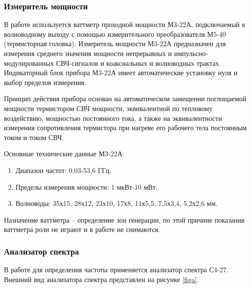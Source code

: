 \documentclass[a4paper,14pt]{extarticle}
\begin{document}
	\subsubsection{Измеритель мощности}
	В работе используется ваттметр проходной мощности М3-22А, подключаемый к волноводному выходу с помощью измерительного преобразователя М5-40 (термисторная головка). Измеритель мощности М3-22А предназначен для измерения среднего значения мощности непрерывных и импульсно-модулированных СВЧ-сигналов и коаксиальных и волноводных трактах. Индикаторный блок прибора М3-22А имеет автоматические установку нуля и выбор пределов измерения.
	
	Принцип действия прибора основан на автоматическом замещении поглощаемой мощности термистором СВЧ мощности, эквивалентной по тепловому воздействию, мощностью постоянного тока, а также на эквивалентности измерения сопротивления термистора при нагреве его рабочего тела постоянным током и током СВЧ.
	
	Основные технические данные М3-22А:
	\begin{enumerate}
		\item	Диапазон частот: 0,03-53,6 ГГц.
		\item	Пределы измерения мощности: 1 мкВт-10 мВт.
		\item	Волноводы: 35х15, 28х12, 23х10, 17х8, 11х5,5, 7,5х3,4, 5,2х2,6 мм.
	\end{enumerate}
	
	Назначение ваттметра -- определение зон генерации, по этой причине показания ваттметра роли не играют и в работе не снимаются. 
	
	\subsubsection{Анализатор спектра}
	
	В работе для определения частоты применяется анализатор спектра С4-27. Внешний вид анализатора спектра представлен на рисунке \ref{figa}.
	
\end{document}
